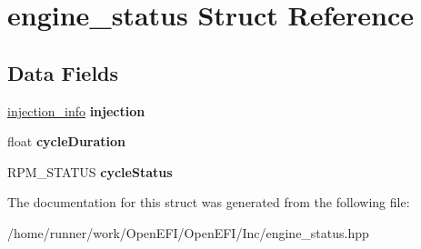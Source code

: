 \hypertarget{structengine__status}{}\section{engine\+\_\+status Struct Reference}
\label{structengine__status}
\subsection*{Data Fields}
\begin{DoxyCompactItemize}
\item 
\mbox{\label{structengine__status_a2b328931cf7dfe38aa7ca69d8e84226b}} 
\hyperlink{structinjection__info}{injection\+\_\+info} {\bfseries injection}
\item 
\mbox{\label{structengine__status_a8218399a0567fbf0567938e57c566525}} 
float {\bfseries cycle\+Duration}
\item 
\mbox{\label{structengine__status_a1eb55790bf2fe901ceff3535018e0dd3}} 
R\+P\+M\+\_\+\+S\+T\+A\+T\+US {\bfseries cycle\+Status}
\end{DoxyCompactItemize}


The documentation for this struct was generated from the following file\+:\begin{DoxyCompactItemize}
\item 
/home/runner/work/\+Open\+E\+F\+I/\+Open\+E\+F\+I/\+Inc/engine\+\_\+status.\+hpp\end{DoxyCompactItemize}
